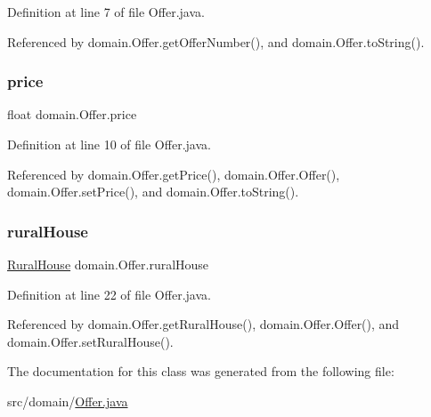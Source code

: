 Definition at line 7 of file Offer.\+java.



Referenced by domain.\+Offer.\+get\+Offer\+Number(), and domain.\+Offer.\+to\+String().

\mbox{\label{classdomain_1_1Offer_a194cfe9363c5bd9e745f56978b03e7fd}} 
\subsubsection{\texorpdfstring{price}{price}}
{\footnotesize\ttfamily float domain.\+Offer.\+price\hspace{0.3cm}{\ttfamily [private]}}



Definition at line 10 of file Offer.\+java.



Referenced by domain.\+Offer.\+get\+Price(), domain.\+Offer.\+Offer(), domain.\+Offer.\+set\+Price(), and domain.\+Offer.\+to\+String().

\mbox{\label{classdomain_1_1Offer_a122573abd92911b25cde7d7e84f488f5}} 
\subsubsection{\texorpdfstring{ruralHouse}{ruralHouse}}
{\footnotesize\ttfamily \mbox{\hyperlink{classdomain_1_1RuralHouse}{Rural\+House}} domain.\+Offer.\+rural\+House\hspace{0.3cm}{\ttfamily [private]}}



Definition at line 22 of file Offer.\+java.



Referenced by domain.\+Offer.\+get\+Rural\+House(), domain.\+Offer.\+Offer(), and domain.\+Offer.\+set\+Rural\+House().



The documentation for this class was generated from the following file\+:\begin{DoxyCompactItemize}
\item 
src/domain/\mbox{\hyperlink{Offer_8java}{Offer.\+java}}\end{DoxyCompactItemize}
